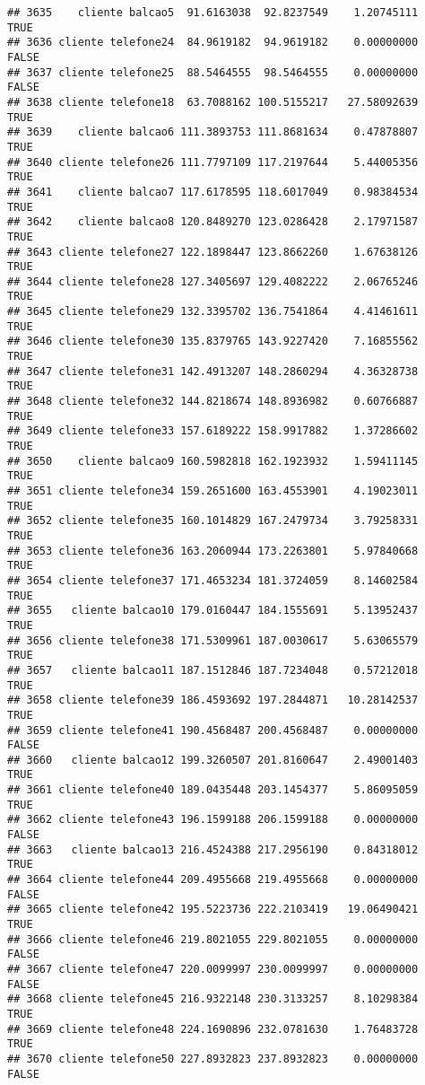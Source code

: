 \documentclass[
]{article}
\begin{document}
\begin{verbatim}
## 3635    cliente balcao5  91.6163038  92.8237549    1.20745111     TRUE
## 3636 cliente telefone24  84.9619182  94.9619182    0.00000000    FALSE
## 3637 cliente telefone25  88.5464555  98.5464555    0.00000000    FALSE
## 3638 cliente telefone18  63.7088162 100.5155217   27.58092639     TRUE
## 3639    cliente balcao6 111.3893753 111.8681634    0.47878807     TRUE
## 3640 cliente telefone26 111.7797109 117.2197644    5.44005356     TRUE
## 3641    cliente balcao7 117.6178595 118.6017049    0.98384534     TRUE
## 3642    cliente balcao8 120.8489270 123.0286428    2.17971587     TRUE
## 3643 cliente telefone27 122.1898447 123.8662260    1.67638126     TRUE
## 3644 cliente telefone28 127.3405697 129.4082222    2.06765246     TRUE
## 3645 cliente telefone29 132.3395702 136.7541864    4.41461611     TRUE
## 3646 cliente telefone30 135.8379765 143.9227420    7.16855562     TRUE
## 3647 cliente telefone31 142.4913207 148.2860294    4.36328738     TRUE
## 3648 cliente telefone32 144.8218674 148.8936982    0.60766887     TRUE
## 3649 cliente telefone33 157.6189222 158.9917882    1.37286602     TRUE
## 3650    cliente balcao9 160.5982818 162.1923932    1.59411145     TRUE
## 3651 cliente telefone34 159.2651600 163.4553901    4.19023011     TRUE
## 3652 cliente telefone35 160.1014829 167.2479734    3.79258331     TRUE
## 3653 cliente telefone36 163.2060944 173.2263801    5.97840668     TRUE
## 3654 cliente telefone37 171.4653234 181.3724059    8.14602584     TRUE
## 3655   cliente balcao10 179.0160447 184.1555691    5.13952437     TRUE
## 3656 cliente telefone38 171.5309961 187.0030617    5.63065579     TRUE
## 3657   cliente balcao11 187.1512846 187.7234048    0.57212018     TRUE
## 3658 cliente telefone39 186.4593692 197.2844871   10.28142537     TRUE
## 3659 cliente telefone41 190.4568487 200.4568487    0.00000000    FALSE
## 3660   cliente balcao12 199.3260507 201.8160647    2.49001403     TRUE
## 3661 cliente telefone40 189.0435448 203.1454377    5.86095059     TRUE
## 3662 cliente telefone43 196.1599188 206.1599188    0.00000000    FALSE
## 3663   cliente balcao13 216.4524388 217.2956190    0.84318012     TRUE
## 3664 cliente telefone44 209.4955668 219.4955668    0.00000000    FALSE
## 3665 cliente telefone42 195.5223736 222.2103419   19.06490421     TRUE
## 3666 cliente telefone46 219.8021055 229.8021055    0.00000000    FALSE
## 3667 cliente telefone47 220.0099997 230.0099997    0.00000000    FALSE
## 3668 cliente telefone45 216.9322148 230.3133257    8.10298384     TRUE
## 3669 cliente telefone48 224.1690896 232.0781630    1.76483728     TRUE
## 3670 cliente telefone50 227.8932823 237.8932823    0.00000000    FALSE

\end{verbatim}
\end{document}
